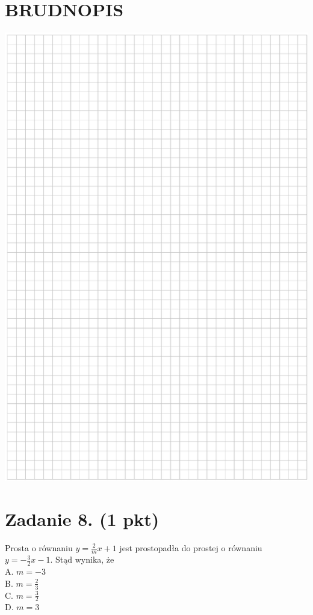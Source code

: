 \documentclass[10pt]{article}
\begin{document}
\section*{BRUDNOPIS}
\begin{center}
\includegraphics[max width=\textwidth]{2024_11_21_e0e8aab895018a50a9a7g-03}
\end{center}

\section*{Zadanie 8. (1 pkt)}
Prosta o równaniu \(y=\frac{2}{m} x+1\) jest prostopadła do prostej o równaniu \(y=-\frac{3}{2} x-1\). Stąd wynika, że\\
A. \(m=-3\)\\
B. \(m=\frac{2}{3}\)\\
C. \(m=\frac{3}{2}\)\\
D. \(m=3\)
\end{document}
